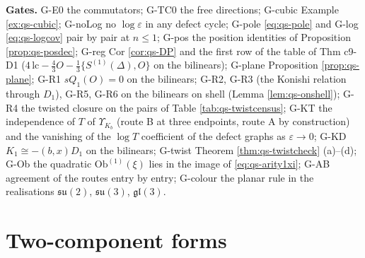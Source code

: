 \documentclass[11pt]{article}
\numberwithin{equation}{section}
\theoremstyle{plain}
\theoremstyle{definition}
\begin{document}
\textbf{Gates.} G-E0 the commutators; G-TC0 the free directions; G-cubic Example \ref{ex:qs-cubic}; G-noLog no $\log\varepsilon$ in any defect cycle; G-pole \eqref{eq:qs-pole} and G-log \eqref{eq:qs-logcov} pair by pair at $n\le1$; G-pos the position identities of Proposition \ref{prop:qs-posdec}; G-reg Cor \ref{cor:qs-DP} and the first row of the table of Thm c9-D1 ($4\,\mathrm{lc}-\tfrac43O-\tfrac13\{S^{(1)}(\Delta),O\}$ on the bilinears); G-plane Proposition \ref{prop:qs-plane}; G-R1 $sQ_1(O)=0$ on the bilinears; G-R2, G-R3 (the Konishi relation through $D_1$), G-R5, G-R6 on the bilinears on shell (Lemma \ref{lem:qs-onshell}); G-R4 the twisted closure on the pairs of Table \ref{tab:qs-twistcensus}; G-KT the independence of $T$ of $\Upsilon_{K_b}$ (route B at three endpoints, route A by construction) and the vanishing of the $\log T$ coefficient of the defect graphs as $\varepsilon\to0$; G-KD $K_1\cong-(b,x)D_1$ on the bilinears; G-twist Theorem \ref{thm:qs-twistcheck} (a)--(d); G-Ob the quadratic $\mathrm{Ob}^{(1)}(\xi)$ lies in the image of \eqref{eq:qs-arity1xi}; G-AB agreement of the routes entry by entry; G-colour the planar rule in the realisations $\mathfrak{su}(2)$, $\mathfrak{su}(3)$, $\mathfrak{gl}(3)$.

\section{Two-component forms}
\label{sec:qs-twocomp}
\end{document}
